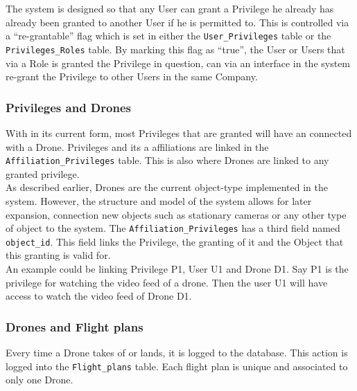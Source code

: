 The system is designed so that any User can grant a Privilege he already has already been granted to another User if he is permitted to.
This is controlled via a ``re-grantable'' flag which is set in either the \verb+User_Privileges+ table or the \verb+Privileges_Roles+ table.
By marking this flag as ``true'', the User or Users that via a Role is granted the Privilege in question, can via an interface in the system re-grant the Privilege to other Users in the same Company.




\subsubsection{Privileges and Drones}
With \projectname{} in its current form, most Privileges that are granted will have an connected with a Drone.
Privileges and its a affiliations are linked in the \verb+Affiliation_Privileges+ table.
This is also where Drones are linked to any granted privilege. \\

As described earlier, Drones are the current object-type implemented in the system.
However, the structure and model of the system allows for later expansion, connection new objects such as stationary cameras or any other type of object to the system.
The \verb+Affiliation_Privileges+ has a third field named \verb+object_id+.
This field links the Privilege, the granting of it and the Object that this granting is valid for. \\

An example could be linking Privilege P1, User U1 and Drone D1.
Say P1 is the privilege for watching the video feed of a drone.
Then the user U1 will have access to watch the video feed of Drone D1.


\subsubsection{Drones and Flight plans}
Every time a Drone takes of or lands, it is logged to the database.
This action is logged into the \verb+Flight_plans+ table.
Each flight plan is unique and associated to only one Drone. \\

